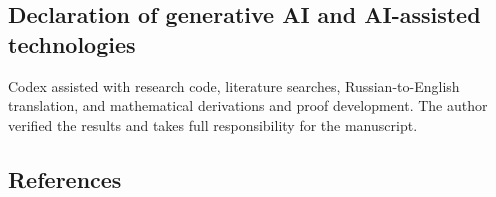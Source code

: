 \documentclass[
  american,
  11pt,
]{article}
\begin{document}
\subsection{Declaration of generative AI and AI-assisted
technologies}\label{declaration-of-generative-ai-and-ai-assisted-technologies}

Codex assisted with research code, literature searches,
Russian-to-English translation, and mathematical derivations and proof
development. The author verified the results and takes full
responsibility for the manuscript.

\subsection*{References}\label{references}
\end{document}
